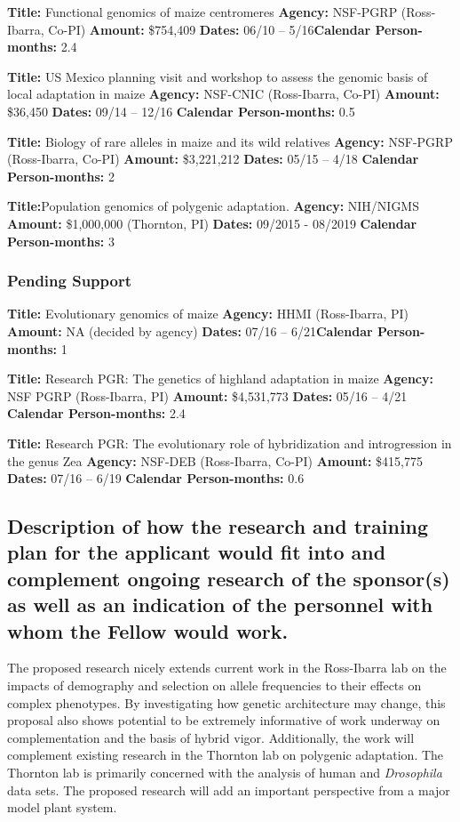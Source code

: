 \noindent\textbf{Title:} Functional genomics of maize centromeres 
\textbf{Agency:} NSF-PGRP (Ross-Ibarra, Co-PI)
\textbf{Amount:} \$754,409
\textbf{Dates:} 06/10 – 5/16\textbf{Calendar Person-months:} 2.4

\noindent\textbf{Title:} US Mexico planning visit and workshop to assess the genomic basis of local adaptation in maize 
\textbf{Agency:} NSF-CNIC (Ross-Ibarra, Co-PI) 
\textbf{Amount:} \$36,450
\textbf{Dates:} 09/14 – 12/16
\textbf{Calendar Person-months:} 0.5

\noindent\textbf{Title:} Biology of rare alleles in maize and its wild relatives 
\textbf{Agency:} NSF-PGRP (Ross-Ibarra, Co-PI)
\textbf{Amount:} \$3,221,212
\textbf{Dates:} 05/15 – 4/18
\textbf{Calendar Person-months:} 2

\noindent\textbf{Title:}Population genomics of polygenic adaptation. 
\textbf{Agency:} NIH/NIGMS 
\textbf{Amount:} \$1,000,000 (Thornton, PI)
\textbf{Dates:} 09/2015 - 08/2019
\textbf{Calendar Person-months:} 3

\subsubsection*{Pending Support}

\noindent\textbf{Title:} Evolutionary genomics of maize 
\textbf{Agency:} HHMI (Ross-Ibarra, PI)
\textbf{Amount:} NA (decided by agency)
\textbf{Dates:} 07/16 – 6/21\textbf{Calendar Person-months:} 1

\noindent\textbf{Title:} Research PGR: The genetics of highland adaptation in maize
\textbf{Agency:} NSF PGRP (Ross-Ibarra, PI)
\textbf{Amount:} \$4,531,773
\textbf{Dates:} 05/16 – 4/21
\textbf{Calendar Person-months:} 2.4

\noindent\textbf{Title:} Research PGR: The evolutionary role of hybridization and introgression in the genus Zea
\textbf{Agency:} NSF-DEB (Ross-Ibarra, Co-PI)
\textbf{Amount:} \$415,775
\textbf{Dates:} 07/16 – 6/19
\textbf{Calendar Person-months:} 0.6

\subsection{Description of how the research and training plan for the applicant would fit into and complement ongoing research of the sponsor(s) as well as an indication of the personnel with whom the Fellow would work.}

The proposed research nicely extends current work in the Ross-Ibarra lab on the impacts of demography and selection on allele frequencies to their effects on complex phenotypes. By investigating how genetic architecture may change, this proposal also shows potential to be extremely informative of work underway on complementation and the basis of hybrid vigor.  Additionally, the work will complement existing research in the Thornton lab on polygenic adaptation.  The Thornton lab is primarily concerned with the analysis of human and \textit{Drosophila} data sets.  The proposed research will add an important perspective from a major model plant system.

